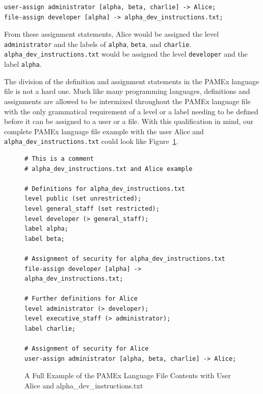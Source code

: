 \begin{verbatim}
user-assign administrator [alpha, beta, charlie] -> Alice; 
file-assign developer [alpha] -> alpha_dev_instructions.txt; 
\end{verbatim}

From these assignment statements, Alice would be assigned the level \texttt{administrator} and the labels 
of \texttt{alpha}, \texttt{beta}, and \texttt{charlie}. \texttt{alpha}\texttt{\_dev}\texttt{\_instructions.txt} would be assigned the level 
\texttt{developer} and the label \texttt{alpha}.  

The division of the definition and assignment statements in the PAMEx 
language file is not a hard one. Much 
like many programming languages, definitions and assignments are 
allowed to be intermixed throughout the PAMEx language 
file with the only grammatical requirement of a level or a label 
needing to be defined before it can be assigned to a user or a file. 
With this qualification in mind, our complete 
PAMEx language file example with the user Alice and \texttt{alpha}\texttt{\_dev}\texttt{\_instructions.txt} could 
look like Figure~\ref{languageex}. 
\clearpage

\begin{figure}[htb]
    \centering
    \begin{tcolorbox}[width=\textwidth, boxsep=5pt, sharp corners, colback=white, colframe=black, fontupper=\footnotesize\ttfamily] %
        \begin{minipage}{\textwidth} %
            \begin{lstlisting}
# This is a comment 
# alpha_dev_instructions.txt and Alice example 

# Definitions for alpha_dev_instructions.txt 
level public (set unrestricted);
level general_staff (set restricted); 
level developer (> general_staff); 
label alpha; 
label beta; 

# Assignment of security for alpha_dev_instructions.txt 
file-assign developer [alpha] -> alpha_dev_instructions.txt;

# Further definitions for Alice 
level administrator (> developer);
level executive_staff (> administrator);
label charlie; 

# Assignment of security for Alice 
user-assign administrator [alpha, beta, charlie] -> Alice;
            \end{lstlisting}
        \end{minipage}
    \end{tcolorbox}
    \caption[Full, Simple PAMEx Language File Example]{\label{languageex}A Full Example of the PAMEx Language File Contents with User Alice and alpha\_dev\_instructions.txt}
\end{figure}

